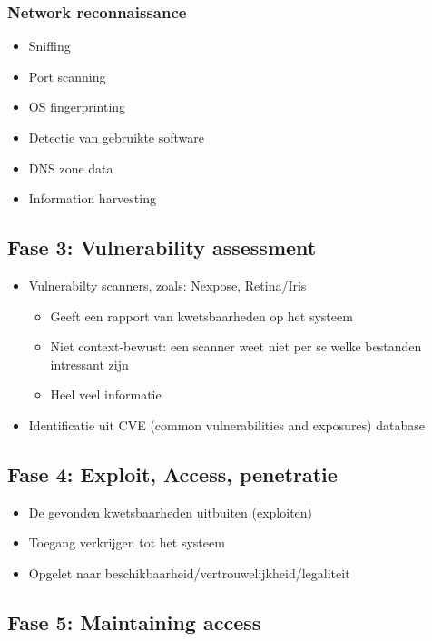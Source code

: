 \documentclass{article}
\begin{document}
\subsubsection{Network reconnaissance}

\begin{itemize}
    \item Sniffing
    \item Port scanning
    \item OS fingerprinting
    \item Detectie van gebruikte software
    \item DNS zone data
    \item Information harvesting
\end{itemize}

\subsection{Fase 3: Vulnerability assessment}

\begin{itemize}
    \item Vulnerabilty scanners, zoals: Nexpose, Retina/Iris
    \begin{itemize}
        \item Geeft een rapport van kwetsbaarheden op het systeem
        \item Niet context-bewust: een scanner weet niet per se welke bestanden intressant zijn
        \item Heel veel informatie
    \end{itemize}
    \item Identificatie uit CVE (common vulnerabilities and exposures) database
\end{itemize}

\subsection{Fase 4: Exploit, Access, penetratie}

\begin{itemize}
    \item De gevonden kwetsbaarheden uitbuiten (exploiten)
    \item Toegang verkrijgen tot het systeem
    \item Opgelet naar beschikbaarheid/vertrouwelijkheid/legaliteit
\end{itemize}


\subsection{Fase 5: Maintaining access}
\end{document}
